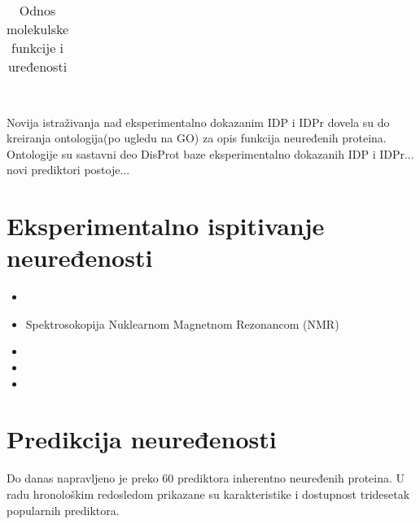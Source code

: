 \begin{table}[h!]
  \centering
  \caption{Odnos molekulske funkcije i uređenosti}
  \label{tab:funkcija_uvod}
  \begin{tabular}{c}
  
  \end{tabular}
\end{table}


 \\
Novija istraživanja nad eksperimentalno dokazanim IDP i IDPr dovela su do kreiranja
ontologija(po ugledu na GO\parencite{GO2000}) za opis funkcija neuređenih
proteina. Ontologije su sastavni deo DisProt\parencite{disprot7} baze
eksperimentalno dokazanih IDP i IDPr... novi prediktori postoje...

\section{Eksperimentalno ispitivanje neuređenosti}

\begin{itemize}
  \item {} 
  \item Spektrosokopija Nuklearnom Magnetnom Rezonancom (NMR) 
  \item {}
  \item {}
  \item {}
\end{itemize}


\section{Predikcija neuređenosti}

Do danas napravljeno je preko 60 prediktora inherentno neuređenih
proteina\parencite{meng2017}. U radu\parencite{meng_c2017} hronološkim
redosledom prikazane su karakteristike i dostupnost tridesetak popularnih
prediktora.


